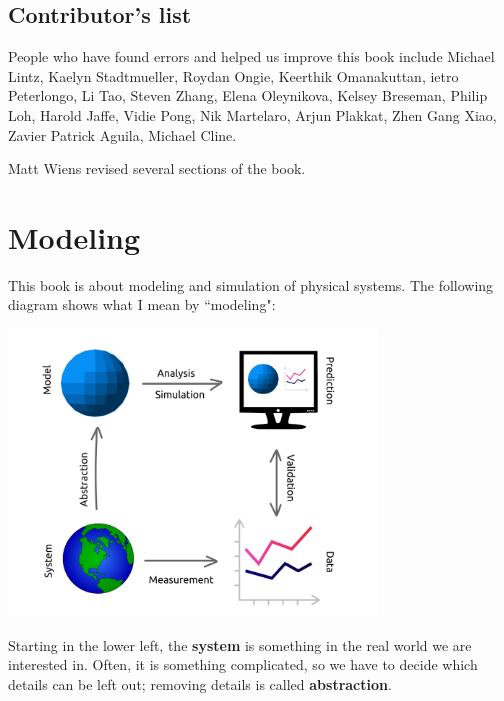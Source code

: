 \documentclass[
]{book}
\numberwithin{Answer}{chapter}
\numberwithin{Exercise}{chapter}
\begin{document}
\newpage

\section*{Contributor's list}

People who have found errors and helped us improve this book include
Michael Lintz, 
Kaelyn Stadtmueller, 
Roydan Ongie, 
Keerthik Omanakuttan, 
ietro Peterlongo, 
Li Tao, 
Steven Zhang, 
Elena Oleynikova, 
Kelsey Breseman, 
Philip Loh, 
Harold Jaffe, 
Vidie Pong, 
Nik Martelaro, 
Arjun Plakkat, 
Zhen Gang Xiao, 
Zavier Patrick Aguila, 
Michael Cline.

Matt Wiens revised several sections of the book.

\newpage


\tableofcontents

\mainmatter

\chapter{Modeling}

This book is about modeling and simulation of physical systems.  
The following diagram shows what I mean by ``modeling":


\vspace{0.2in}
\centerline{\includegraphics[height=3in]{book/figs/modeling_framework.pdf}}

Starting in the lower left, the {\bf system} is something in the real world we are interested in.  Often, it is something complicated, so we have to decide which details can be left out; removing details is called {\bf abstraction}.
\end{document}
